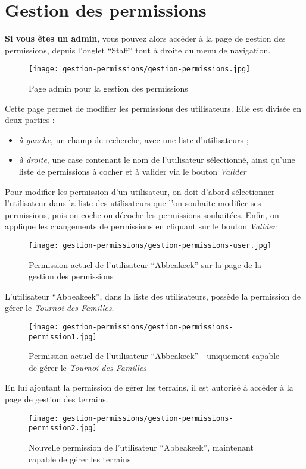 \section{Gestion des permissions}
\label{Gestion des permissions}

\textbf{Si vous êtes un admin}, vous pouvez alors accéder à la page de gestion des permissions, depuis l'onglet \enquote{Staff} tout à droite du menu de navigation.

\begin{figure}[H]
\centering
\texttt{[image: gestion-permissions/gestion-permissions.jpg]}
\caption{Page admin pour la gestion des permissions}
\end{figure}

Cette page permet de modifier les permissions des utilisateurs. Elle est divisée en deux parties :

\begin{itemize}
\item \textit{à gauche}, un champ de recherche, avec une liste d'utilisateurs ;
\item \textit{à droite}, une case contenant le nom de l'utilisateur sélectionné, ainsi qu'une liste de permissions à cocher et à valider via le bouton \textit{Valider}
\end{itemize}
\bigskip

Pour modifier les permission d'un utilisateur, on doit d'abord sélectionner l'utilisateur dans la liste des utilisateurs que l'on souhaite modifier ses permissions, puis on coche ou décoche les permissions souhaitées. Enfin, on applique les changements de permissions en cliquant sur le bouton \textit{Valider}.\newline

\begin{figure}[H]
\centering
\texttt{[image: gestion-permissions/gestion-permissions-user.jpg]}
\caption{Permission actuel de l'utilisateur \enquote{Abbeakeek} sur la page de la gestion des permissions}
\end{figure}

L'utilisateur \enquote{Abbeakeek}, dans la liste des utilisateurs, possède la permission de gérer le \textit{Tournoi des Familles}.

\begin{figure}[H]
\centering
\texttt{[image: gestion-permissions/gestion-permissions-permission1.jpg]}
\caption{Permission actuel de l'utilisateur \enquote{Abbeakeek} - uniquement capable de gérer le \textit{Tournoi des Familles}}
\end{figure}

En lui ajoutant la permission de gérer les terrains, il est autorisé à accéder à la page de gestion des terrains.

\begin{figure}[H]
\centering
\texttt{[image: gestion-permissions/gestion-permissions-permission2.jpg]}
\caption{Nouvelle permission de l'utilisateur \enquote{Abbeakeek}, maintenant capable de gérer les terrains}
\end{figure}
